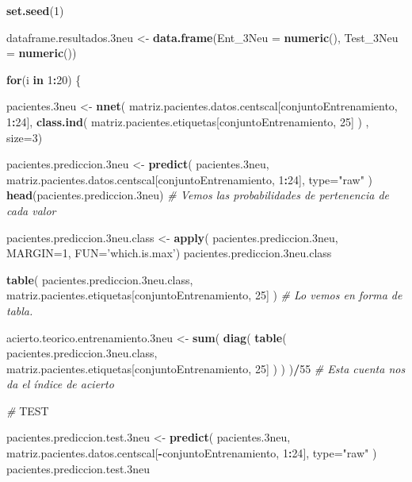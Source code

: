 \documentclass[]{article}
\newenvironment{Shaded}{\begin{snugshade}}{\end{snugshade}}
\newcommand{\KeywordTok}[1]{\textcolor[rgb]{0.13,0.29,0.53}{\textbf{#1}}}
\newcommand{\DataTypeTok}[1]{\textcolor[rgb]{0.13,0.29,0.53}{#1}}
\newcommand{\DecValTok}[1]{\textcolor[rgb]{0.00,0.00,0.81}{#1}}
\newcommand{\StringTok}[1]{\textcolor[rgb]{0.31,0.60,0.02}{#1}}
\newcommand{\CommentTok}[1]{\textcolor[rgb]{0.56,0.35,0.01}{\textit{#1}}}
\newcommand{\ControlFlowTok}[1]{\textcolor[rgb]{0.13,0.29,0.53}{\textbf{#1}}}
\newcommand{\OperatorTok}[1]{\textcolor[rgb]{0.81,0.36,0.00}{\textbf{#1}}}
\newcommand{\AlertTok}[1]{\textcolor[rgb]{0.94,0.16,0.16}{#1}}
\newcommand{\NormalTok}[1]{#1}
\begin{document}
\begin{Shaded}
\begin{Highlighting}[]
\KeywordTok{set.seed}\NormalTok{(}\DecValTok{1}\NormalTok{)}

\NormalTok{dataframe.resultados.3neu <-}\StringTok{ }\KeywordTok{data.frame}\NormalTok{(}\DataTypeTok{Ent_3Neu =} \KeywordTok{numeric}\NormalTok{(),}
                                        \DataTypeTok{Test_3Neu =} \KeywordTok{numeric}\NormalTok{())}

\ControlFlowTok{for}\NormalTok{(i }\ControlFlowTok{in} \DecValTok{1}\OperatorTok{:}\DecValTok{20}\NormalTok{)}
\NormalTok{\{}

\NormalTok{  pacientes.3neu <-}\StringTok{ }\KeywordTok{nnet}\NormalTok{( matriz.pacientes.datos.centscal[conjuntoEntrenamiento, }\DecValTok{1}\OperatorTok{:}\DecValTok{24}\NormalTok{], }\KeywordTok{class.ind}\NormalTok{( matriz.pacientes.etiquetas[conjuntoEntrenamiento, }\DecValTok{25}\NormalTok{] ) , }\DataTypeTok{size=}\DecValTok{3}\NormalTok{)}
  
\NormalTok{  pacientes.prediccion.3neu <-}\StringTok{ }\KeywordTok{predict}\NormalTok{( pacientes.3neu, matriz.pacientes.datos.centscal[conjuntoEntrenamiento, }\DecValTok{1}\OperatorTok{:}\DecValTok{24}\NormalTok{], }\DataTypeTok{type=}\StringTok{"raw"}\NormalTok{ )}
  \KeywordTok{head}\NormalTok{(pacientes.prediccion.3neu) }\CommentTok{# Vemos las probabilidades de pertenencia de cada valor}
  
  
\NormalTok{  pacientes.prediccion.3neu.class <-}\StringTok{ }\KeywordTok{apply}\NormalTok{( pacientes.prediccion.3neu, }\DataTypeTok{MARGIN=}\DecValTok{1}\NormalTok{, }\DataTypeTok{FUN=}\StringTok{'which.is.max'}\NormalTok{)}
\NormalTok{  pacientes.prediccion.3neu.class}
  
  
  \KeywordTok{table}\NormalTok{( pacientes.prediccion.3neu.class, matriz.pacientes.etiquetas[conjuntoEntrenamiento, }\DecValTok{25}\NormalTok{] )  }\CommentTok{# Lo vemos en forma de tabla.}
  
  
\NormalTok{  acierto.teorico.entrenamiento.3neu <-}\StringTok{ }\KeywordTok{sum}\NormalTok{( }\KeywordTok{diag}\NormalTok{( }\KeywordTok{table}\NormalTok{( pacientes.prediccion.3neu.class, matriz.pacientes.etiquetas[conjuntoEntrenamiento, }\DecValTok{25}\NormalTok{] ) ) )}\OperatorTok{/}\DecValTok{55} \CommentTok{# Esta cuenta nos da el índice de acierto}
  
  \CommentTok{# }\AlertTok{TEST}
  
\NormalTok{  pacientes.prediccion.test.3neu <-}\StringTok{ }\KeywordTok{predict}\NormalTok{( pacientes.3neu, matriz.pacientes.datos.centscal[}\OperatorTok{-}\NormalTok{conjuntoEntrenamiento, }\DecValTok{1}\OperatorTok{:}\DecValTok{24}\NormalTok{], }\DataTypeTok{type=}\StringTok{"raw"}\NormalTok{ )}
\NormalTok{  pacientes.prediccion.test.3neu}
  

\end{Highlighting}
\end{Shaded}
\end{document}
